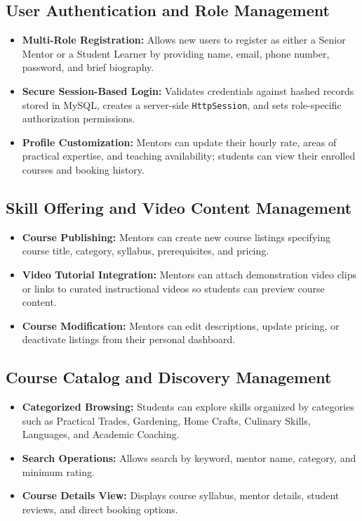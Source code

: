 \documentclass[12pt,a4paper]{report}
\begin{document}
\subsection{User Authentication and Role Management}
\begin{itemize}[leftmargin=1.5em, itemsep=2pt]
  \item \textbf{Multi-Role Registration:} Allows new users to register as either a Senior Mentor or a Student Learner by providing name, email, phone number, password, and brief biography.
  \item \textbf{Secure Session-Based Login:} Validates credentials against hashed records stored in MySQL, creates a server-side \texttt{HttpSession}, and sets role-specific authorization permissions.
  \item \textbf{Profile Customization:} Mentors can update their hourly rate, areas of practical expertise, and teaching availability; students can view their enrolled courses and booking history.
\end{itemize}

\subsection{Skill Offering and Video Content Management}
\begin{itemize}[leftmargin=1.5em, itemsep=2pt]
  \item \textbf{Course Publishing:} Mentors can create new course listings specifying course title, category, syllabus, prerequisites, and pricing.
  \item \textbf{Video Tutorial Integration:} Mentors can attach demonstration video clips or links to curated instructional videos so students can preview course content.
  \item \textbf{Course Modification:} Mentors can edit descriptions, update pricing, or deactivate listings from their personal dashboard.
\end{itemize}

\subsection{Course Catalog and Discovery Management}
\begin{itemize}[leftmargin=1.5em, itemsep=2pt]
  \item \textbf{Categorized Browsing:} Students can explore skills organized by categories such as Practical Trades, Gardening, Home Crafts, Culinary Skills, Languages, and Academic Coaching.
  \item \textbf{Search Operations:} Allows search by keyword, mentor name, category, and minimum rating.
  \item \textbf{Course Details View:} Displays course syllabus, mentor details, student reviews, and direct booking options.
\end{itemize}
\end{document}
